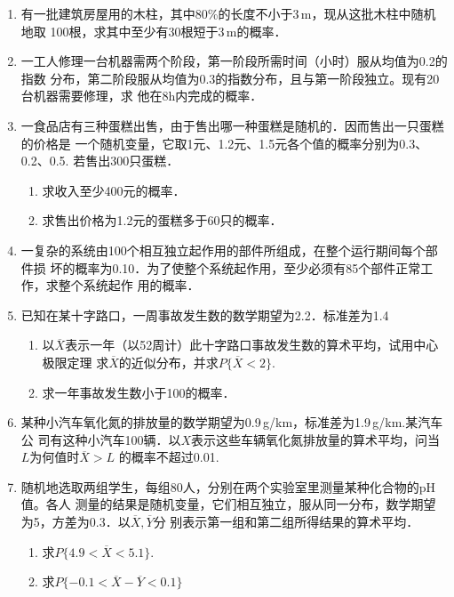 \documentclass[10pt,a4paper]{article}
\begin{document}
\begin{enumerate}
    \item 有一批建筑房屋用的木柱，其中80\%的长度不小于3$\, $m，现从这批木柱中随机地取
    100根，求其中至少有30根短于3$\, $m的概率．


    \item 一工人修理一台机器需两个阶段，第一阶段所需时间（小时）服从均值为0.2的指数
    分布，第二阶段服从均值为0.3的指数分布，且与第一阶段独立。现有20台机器需要修理，求
    他在8h内完成的概率．


    \item 一食品店有三种蛋糕出售，由于售出哪一种蛋糕是随机的．因而售出一只蛋糕的价格是
    一个随机变量，它取1元、1.2元、1.5元各个值的概率分别为0.3、0.2、0.5. 若售出300只蛋糕．
    \begin{enumerate}
        \item 求收入至少400元的概率．
        \item 求售出价格为1.2元的蛋糕多于60只的概率．
    \end{enumerate}



    \item 一复杂的系统由100个相互独立起作用的部件所组成，在整个运行期间每个部件损
    坏的概率为0.10．为了使整个系统起作用，至少必须有85个部件正常工作，求整个系统起作
    用的概率．


    \item 已知在某十字路口，一周事故发生数的数学期望为2.2．标准差为1.4
    \begin{enumerate}
        \item 以$\overline{X}$表示一年（以52周计）此十字路口事故发生数的算术平均，试用中心极限定理
        求$\overline{X}$的近似分布，并求$P\{\overline{X}<2\}$.
        \item 求一年事故发生数小于100的概率．
    \end{enumerate}


    \item 某种小汽车氧化氮的排放量的数学期望为0.9$\, $g/km，标准差为1.9$\, $g/km.某汽车公
    司有这种小汽车100辆．以$X$表示这些车辆氧化氮排放量的算术平均，问当$L$为何值时$\overline{X}>L$
    的概率不超过0.01.



    \item 随机地选取两组学生，每组80人，分别在两个实验室里测量某种化合物的pH值。各人
    测量的结果是随机变量，它们相互独立，服从同一分布，数学期望为5，方差为0.3．以$\overline{X},\overline{Y}$分
    别表示第一组和第二组所得结果的算术平均．
    \begin{enumerate}
        \item 求$P\{4.9<\overline{X}<5.1\}$.
        \item 求$P\{-0.1<\overline{X}-\overline{Y}<0.1\}$
    \end{enumerate}




\end{enumerate}
\end{document}
